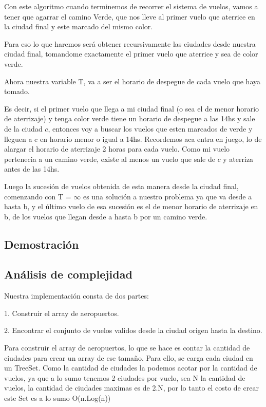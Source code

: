 Con este algoritmo cuando terminemos de recorrer el sistema de vuelos, vamos a tener que agarrar el camino Verde, que nos lleve al primer vuelo que aterrice en la ciudad final y este marcado del mismo color.

Para eso lo que haremos ser\'a obtener recursivamente las ciudades desde nuestra ciudad final, tomandome exactamente el primer vuelo que aterrice y sea de color verde.

Ahora nuestra variable T, va a ser el horario de despegue de cada vuelo que haya tomado. 

Es decir, si el primer vuelo que llega a mi ciudad final (o sea el de menor horario de aterrizaje) y tenga color verde tiene un horario de despegue a las 14hs y sale de la ciudad $c$, entonces voy a buscar los vuelos que esten marcados de verde y lleguen a c en horario menor o igual a 14hs. Recordemos aca entra en juego, lo de alargar el horario de aterrizaje 2 horas para cada vuelo.
Como mi vuelo pertenecia a un camino verde, existe al menos un vuelo que sale de $c$ y aterriza antes de las 14hs.

Luego la sucesi\'on de vuelos obtenida de esta manera desde la ciudad final, comenzando con T = $\infty$ es una soluci\'on a nuestro problema ya que va desde a hasta b, y el \'ultimo vuelo de esa sucesi\'on es el de menor horario de aterrizaje en b, de los vuelos que llegan desde a hasta b por un camino verde.

\subsection{Demostración}
\newpage

\subsection{Análisis de complejidad}
Nuestra implementaci\'on consta de dos partes:

1. Construir el array de aeropuertos.

2. Encontrar el conjunto de vuelos validos desde la ciudad origen hasta la destino.

Para construir el array de aeropuertos, lo que se hace es contar la cantidad de ciudades para crear un array de ese tamaño.
Para ello, se carga cada ciudad en un TreeSet. Como la cantidad de ciudades la podemos acotar por la cantidad de vuelos, ya que a lo sumo tenemos 2 ciudades por vuelo, sea N la cantidad de vuelos, la cantidad de ciudades maximas es de 2.N, por lo tanto el costo de crear este Set es a lo sumo O(n.Log(n))

